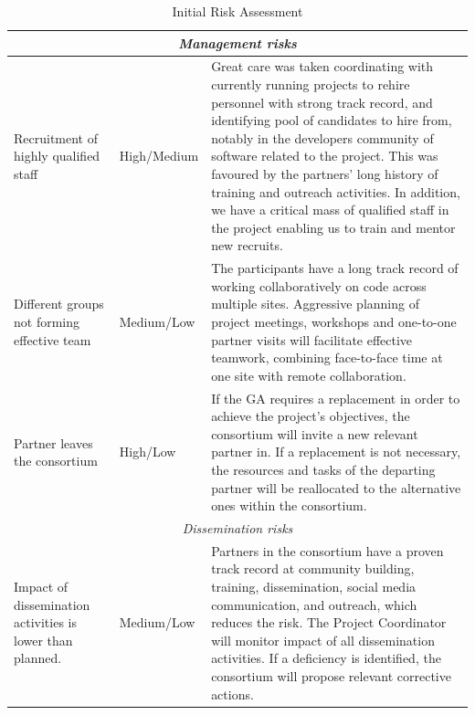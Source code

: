 \begin{table}
\begin{center}
\begin{tabular}{|m{}|m{}|m{}|}
  \multicolumn{3}{|c|}{
    \textit{Management risks}
  }
  \\\hline

  Recruitment of highly qualified staff & High/Medium &

  Great care was taken coordinating with currently running projects to
  rehire personnel with strong track record, and identifying pool of
  candidates to hire from, notably in the developers community of
  software related to the project. This was favoured by the partners'
  long history of training and outreach activities. In addition, we
  have a critical mass of qualified staff in the project enabling us
  to train and mentor new recruits.

 \\\hline

  Different groups not forming effective team & Medium/Low & The participants have a long
  track record of working collaboratively on code across multiple
  sites. Aggressive planning of project meetings, workshops and
  one-to-one partner visits will facilitate effective teamwork,
  combining face-to-face time at one site with remote
  collaboration.\\\hline

  Partner leaves the consortium & High/Low & If the GA requires a replacement
  in order to achieve the project's objectives, the consortium will invite a new
  relevant partner in. If a replacement is not necessary, the resources and tasks
  of the departing partner will be reallocated to the alternative ones within the
  consortium.
  \\\hline

  \multicolumn{3}{|c|}{
    \textit{Dissemination risks}
  }
  \\\hline

  Impact of dissemination activities is lower than planned. & Medium/Low &

  Partners in the consortium have a proven track record at community
  building, training, dissemination, social media communication, and
  outreach, which reduces the risk. The Project Coordinator
  will monitor impact of all dissemination activities. If a deficiency is identified, the consortium
  will propose relevant corrective actions.\\\hline

  \end{tabular}
\end{center}
\caption{\label{risk-table}Initial Risk Assessment}
\end{table}
\fi

